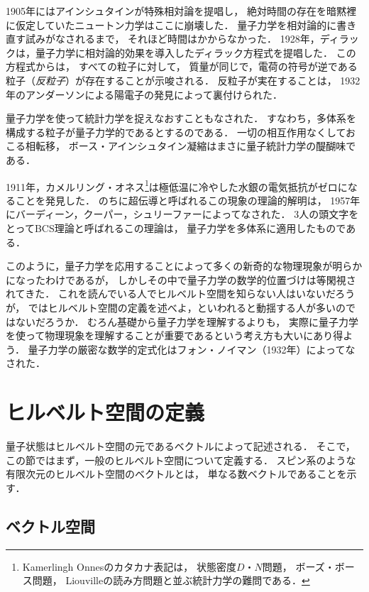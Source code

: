 \documentclass[
]{sotsu}
\begin{document}
1905年にはアインシュタインが特殊相対論を提唱し，
絶対時間の存在を暗黙裡に仮定していたニュートン力学はここに崩壊した．
量子力学を相対論的に書き直す試みがなされるまで，
それほど時間はかからなかった．
1928年，ディラックは，量子力学に相対論的効果を導入したディラック方程式を提唱した．
この方程式からは，
すべての粒子に対して，
質量が同じで，電荷の符号が逆である粒子（\emph{反粒子}）が存在することが示唆される．
反粒子が実在することは，
1932年のアンダーソンによる陽電子の発見によって裏付けられた．


量子力学を使って統計力学を捉えなおすこともなされた．
すなわち，多体系を構成する粒子が量子力学的であるとするのである．
一切の相互作用なくしておこる相転移，
ボース・アインシュタイン凝縮はまさに量子統計力学の醍醐味である．


1911年，カメルリング・オネス\footnote{
    Kamerlingh Onnesのカタカナ表記は，
    状態密度$D$・$N$問題，
    ボーズ・ボース問題，
    Liouvilleの読み方問題と並ぶ統計力学の難問である．
}は極低温に冷やした水銀の電気抵抗がゼロになることを発見した．
のちに超伝導と呼ばれるこの現象の理論的解明は，
1957年にバーディーン，クーパー，シュリーファーによってなされた．
3人の頭文字をとってBCS理論と呼ばれるこの理論は，
量子力学を多体系に適用したものである．


このように，量子力学を応用することによって多くの新奇的な物理現象が明らかになったわけであるが，
しかしその中で量子力学の数学的位置づけは等閑視されてきた．
これを読んでいる人でヒルベルト空間を知らない人はいないだろうが，
ではヒルベルト空間の定義を述べよ，といわれると動揺する人が多いのではないだろうか．
むろん基礎から量子力学を理解するよりも，
実際に量子力学を使って物理現象を理解することが重要であるという考え方も大いにあり得よう．
量子力学の厳密な数学的定式化はフォン・ノイマン（1932年）によってなされた．







\section{ヒルベルト空間の定義}

量子状態はヒルベルト空間の元であるベクトルによって記述される．
そこで，この節ではまず，一般のヒルベルト空間について定義する．
スピン系のような有限次元のヒルベルト空間のベクトルとは，
単なる数ベクトルであることを示す．


\subsection{ベクトル空間}
\end{document}
